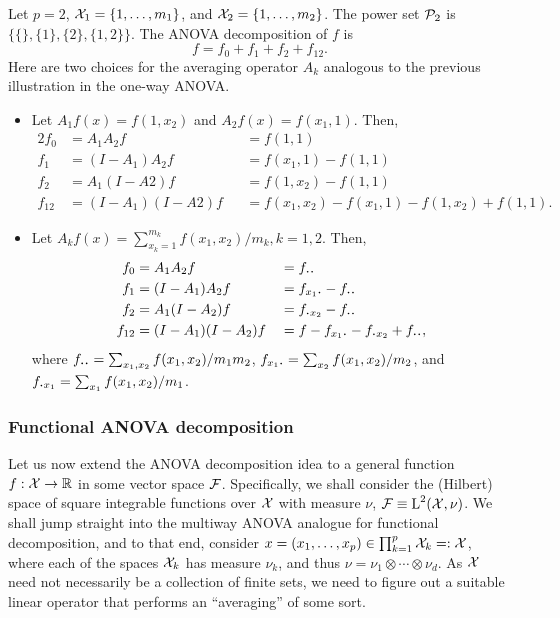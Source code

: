 \begin{example}
  Let $p=2$, ${\mathcal X}_1=\{1,\dots,m_1\}$, and ${\mathcal X}_2=\{1,\dots,m_2\}$.
  The power set ${\mathcal P}_2$ is $\big\{ \{\}, \{1\}, \{2\}, \{1,2\} \big\}$.
  The ANOVA decomposition of $f$ is
  \[
    f = f_0 + f_1 + f_2 + f_{12}.
  \]
  Here are two choices for the averaging operator $A_k$ analogous to the previous illustration in the one-way ANOVA.
  \begin{itemize}
    \item Let $A_1f(x) = f(1,x_2)$ and $A_2f(x) = f(x_1,1)$. Then,
    \begin{alignat*}{2}
      f_0 &= A_1A_2 f          &&= f(1,1) \\
      f_1 &= (I-A_1)A_2f       &&= f(x_1,1) - f(1,1) \\
      f_2 &= A_1(I-A2)f        &&= f(1,x_2) - f(1,1) \\
      f_{12} &= (I-A_1)(I-A2)f &&= f(x_1,x_2) - f(x_1,1) - f(1,x_2) + f(1,1).
    \end{alignat*}
    \item Let $A_kf(x) = \sum_{x_k=1}^{m_k} f(x_1,x_2) / m_k, k=1,2$. Then,
    \begin{alignat*}{2}
      f_0 &= A_1A_2 f          &&= f_{\bigcdot\bigcdot} \\
      f_1 &= (I-A_1)A_2f       &&= f_{x_1\bigcdot} - f_{\bigcdot\bigcdot} \\
      f_2 &= A_1(I-A_2)f        &&= f_{\bigcdot x_2} - f_{\bigcdot\bigcdot} \\
      f_{12} &= (I-A_1)(I-A_2)f &&= f - f_{x_1\bigcdot} - f_{\bigcdot x_2} + f_{\bigcdot\bigcdot},
    \end{alignat*}
    where $f_{\bigcdot\bigcdot} = \sum_{x_1,x_2} f(x_1,x_2) / m_1m_2$, $ f_{x_1\bigcdot} = \sum_{x_2} f(x_1,x_2)/m_2$, and \newline $f_{\bigcdot x_1} = \sum_{x_1} f(x_1,x_2)/m_1$.
  \end{itemize}
\end{example}

\subsubsection{Functional ANOVA decomposition}

Let us now extend the ANOVA decomposition idea to a general function $f:{\mathcal X}\to\mathbb{R}$ in some vector space ${\mathcal F}$.
Specifically, we shall consider the (Hilbert) space of square integrable functions over ${\mathcal X}$ with measure $\nu$, ${\mathcal F} \equiv \text{L}^2({\mathcal X},\nu)$.
We shall jump straight into the multiway ANOVA analogue for functional decomposition, and to that end, consider $x=(x_1,\dots,x_p) \in \prod_{k=1}^p {\mathcal X}_k =: {\mathcal X}$, where each of the spaces ${\mathcal X}_k$ has measure $\nu_k$, and thus $\nu=\nu_1\otimes\cdots\otimes\nu_d$.
As ${\mathcal X}$ need not necessarily be a collection of finite sets, we need to figure out a suitable linear operator that performs an ``averaging'' of some sort.


